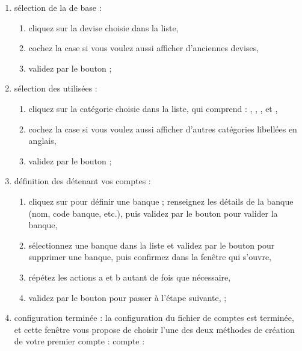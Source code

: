 \begin{enumerate}
	\item sélection de la  de base :
		\begin{enumerate} 
		 	\item cliquez sur la devise choisie dans la liste,
			\item cochez la case  si vous voulez aussi afficher d'anciennes devises,
			\item validez par le bouton  ;
		\end{enumerate}
	\item sélection des  utilisées :
		\begin{enumerate} 
		 	\item cliquez sur la catégorie choisie dans la liste, qui comprend : , , ,  et ,
			\item cochez la case  si vous voulez aussi afficher d'autres catégories libellées en anglais,
			\item validez par le bouton  ;
		\end{enumerate}		

	\item définition des  détenant vos comptes :
		\begin{enumerate} 
		 	\item cliquez sur   pour définir une banque ; renseignez les détails de la banque (nom, code banque, etc.), puis validez par le bouton  pour valider la banque,
			\item sélectionnez une banque dans la liste et validez par le bouton  pour supprimer une banque, puis confirmez dans la fenêtre qui s'ouvre,
			\item répétez les actions a et b autant de fois que nécessaire,
			\item  validez par le bouton  pour passer à l'étape suivante,  ;
		\end{enumerate}		 	

	\item configuration terminée  : la configuration du fichier de comptes est terminée, et cette fenêtre vous propose de choisir l'une des deux méthodes de création de votre premier
\ifIllustration compte :
\else compte :
\fi


\end{enumerate}
